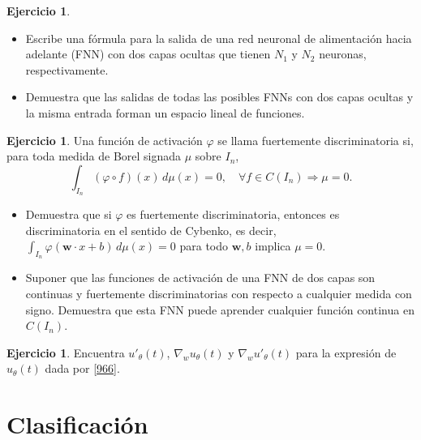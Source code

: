 \documentclass[12pt, a4paper]{amsbook}
\newcommand{\ww}{{\mathbf w}}
\theoremstyle{remark}
\theoremstyle{definition}
\newtheorem{ejer}[teo]{Ejercicio}
\numberwithin{section}{chapter}
\numberwithin{subsection}{section}
\numberwithin{equation}{section}
\numberwithin{figure}{chapter}
\begin{document}
\begin{ejer}
\begin{itemize}
\item[(a)] Escribe una fórmula para la salida de una red neuronal de alimentación hacia adelante (FNN) con dos capas ocultas que tienen $N_1$ y $N_2$ neuronas, respectivamente.
\item[(b)] Demuestra que las salidas de todas las posibles FNNs con dos capas ocultas y la misma entrada forman un espacio lineal de funciones.
\end{itemize}
\end{ejer}

\begin{ejer}
Una función de activación $\varphi$ se llama fuertemente discriminatoria si, para toda medida de Borel signada $\mu$ sobre $I_n$,
$$
\int_{I_n} (\varphi \circ f)(x) \, d\mu(x) = 0, \quad \forall f \in C(I_n) \Rightarrow \mu = 0.
$$
\begin{itemize}
\item[(a)] Demuestra que si $\varphi$ es fuertemente discriminatoria, entonces es discriminatoria en el sentido de Cybenko, es decir, $\int_{I_n}\varphi(\ww\cdot x+b)\,d\mu(x)=0$ para todo $\ww,b$ implica $\mu=0$.
\item[(b)] Suponer que las funciones de activación de una FNN de dos capas son continuas y fuertemente discriminatorias con respecto a cualquier medida con signo. Demuestra que esta FNN puede aprender cualquier función continua en $C(I_n)$.
\end{itemize}
\end{ejer}

\begin{ejer}\label{9.8.11}
Encuentra $u'_{\theta}(t)$, $\nabla_w u_{\theta}(t)$ y $\nabla_w u'_{\theta}(t)$ para la expresión de $u_{\theta}(t)$ dada por \eqref{966}.
\end{ejer}





\chapter{Clasificación}
\end{document}
